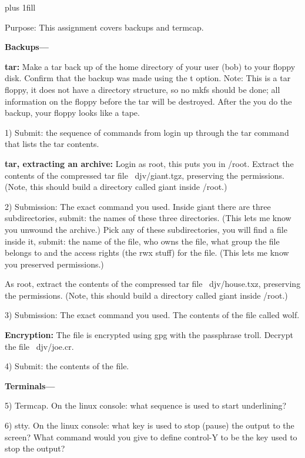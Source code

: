 
\rightskip=0pt plus 1fill

\parindent 0pt

Purpose: This assignment covers backups and termcap.

{\bf Backups---}

{\bf tar:}
Make a tar back up of the home directory of your user (bob) to your floppy
disk.
Confirm that the backup was made using the {\ltt{}t} option.
Note: This is a tar floppy, it does not have a directory structure,
so no mkfs should be done; all information on the floppy before
the tar will be destroyed. After the you do the backup, your
floppy looks like a tape.

1) Submit: the sequence of commands from login up through the
tar command that lists the tar contents.

{\bf tar, extracting an archive:}
Login as root, this puts you in {\ltt{}/root}.
Extract the contents of the compressed tar file {\ltt{}~djv/giant.tgz},
preserving the permissions.
(Note, this should build a directory called {\ltt{}giant} inside {\ltt{}/root}.)

2) Submission: The exact command you used.
Inside {\ltt{}giant} there are three subdirectories, submit: the names of
these three directories. (This lets me know you unwound the archive.)
Pick any of these subdirectories, you will find a file inside it,
submit: the name of the file, who owns the file, what group the file
belongs to and the access rights (the {\ltt{}rwx} stuff) for the file.
(This lets me know you preserved permissions.)

As root,
extract the contents of the compressed tar file {\ltt{}~djv/house.txz},
preserving the permissions.
(Note, this should build a directory called {\ltt{}giant} inside {\ltt{}/root}.)

3) Submission: The exact command you used. The contents
of the file called {\ltt{}wolf}.

{\bf Encryption:}
The file is encrypted using gpg with the passphrase {\ltt{}troll}.
Decrypt the file {\ltt{}~djv/joe.cr}.

4) Submit: the contents of the file.


{\bf Terminals---}

5) Termcap.
On the linux console: what sequence is used to 
start underlining?

6) stty.
On the linux console: what key is used to stop (pause) the output to the
screen?
What command would you give to define control-Y to be the key used
to stop the output?

\bye
